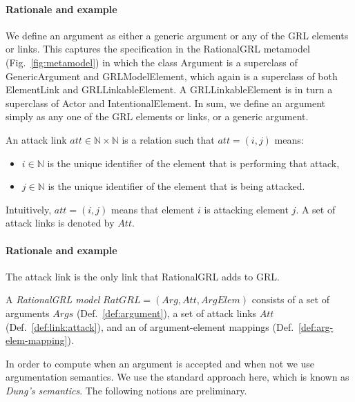 \paragraph{Rationale and example} We define an argument as either a generic argument or any of the GRL elements or links. This captures the specification in the RationalGRL metamodel (Fig.~\ref{fig:metamodel}) in which the class \textsf{Argument} is a superclass of \textsf{GenericArgument} and \textsf{GRLModelElement}, which again is a superclass of both \textsf{ElementLink} and \textsf{GRLLinkableElement}. A \textsf{GRLLinkableElement} is in turn a superclass of \textsf{Actor} and \textsf{IntentionalElement}. In sum, we define an argument simply as any one of the GRL elements or links, or a generic argument.

\begin{definition}
\label{def:link:attack}
An attack link $att\in \mathbb{N}\times \mathbb{N}$ is a relation such that $att=(i,j)$ means:
\begin{itemize}
\item $i\in \mathbb{N}$ is the unique identifier of the element that is performing that attack,
\item $j\in \mathbb{N}$ is the unique identifier of the element that is being attacked.
\end{itemize}
Intuitively, $att=(i,j)$ means that element $i$ is attacking element $j$. A set of attack links is denoted by $Att$.
\end{definition}

\paragraph{Rationale and example} The attack link is the only link that RationalGRL adds to GRL.

\begin{definition}
\label{def:rationalgrl-model}
A \emph{RationalGRL model} $RatGRL=(Arg, Att, ArgElem)$ consists of a set of arguments $Args$ (Def.~\ref{def:argument}), a set of attack links $Att$ (Def.~\ref{def:link:attack}), and an of argument-element mappings (Def.~\ref{def:arg-elem-mapping}).
\end{definition}

In order to compute when an argument is accepted and when not we use argumentation semantics.  We use the standard approach here, which is known as \emph{Dung's semantics}. The following notions are preliminary.

